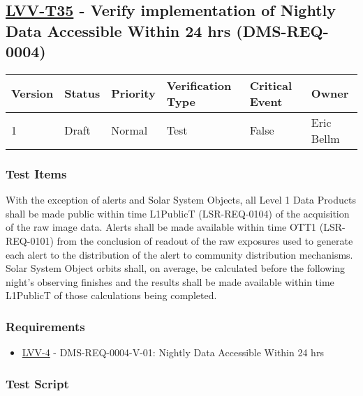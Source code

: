 \hypertarget{lvv-t35---verify-implementation-of-nightly-data-accessible-within-24-hrs-dms-req-0004}{%
\subsection{\texorpdfstring{\href{https://jira.lsstcorp.org/secure/Tests.jspa\#/testCase/LVV-T35}{LVV-T35}
- Verify implementation of Nightly Data Accessible Within 24 hrs
(DMS-REQ-0004)}{LVV-T35 - Verify implementation of Nightly Data Accessible Within 24 hrs (DMS-REQ-0004)}}\label{lvv-t35---verify-implementation-of-nightly-data-accessible-within-24-hrs-dms-req-0004}}

\begin{longtable}[]{@{}llllll@{}}
\toprule
Version & Status & Priority & Verification Type & Critical Event &
Owner\tabularnewline
\midrule
\endhead
1 & Draft & Normal & Test & False & Eric Bellm\tabularnewline
\bottomrule
\end{longtable}

\hypertarget{test-items-11}{%
\subsubsection{Test Items}\label{test-items-11}}

With the exception of alerts and Solar System Objects, all Level 1 Data
Products shall be made public within time L1PublicT (LSR-REQ-0104) of
the acquisition of the raw image data. Alerts shall be made available
within time OTT1 (LSR-REQ-0101) from the conclusion of readout of the
raw exposures used to generate each alert to the distribution of the
alert to community distribution mechanisms. Solar System Object orbits
shall, on average, be calculated before the following night's observing
finishes and the results shall be made available within time L1PublicT
of those calculations being completed.

\hypertarget{requirements-12}{%
\subsubsection{Requirements}\label{requirements-12}}

\begin{itemize}
\tightlist
\item
  \href{https://jira.lsstcorp.org/browse/LVV-4}{LVV-4} -
  DMS-REQ-0004-V-01: Nightly Data Accessible Within 24 hrs
\end{itemize}

\hypertarget{test-script-12}{%
\subsubsection{Test Script}\label{test-script-12}}


